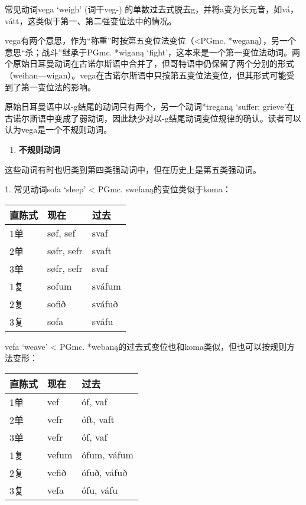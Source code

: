 常见动词vega `weigh‌' (词干veg-)
的单数过去式脱去g，并将a变为长元音，如vá，vátt，这类似于第一、第二强变位法中的情况。

vega有两个意思，作为``称重''时按第五变位法变位（\textless PGmc.
*weganą），另一个意思``杀；战斗''继承于PGmc. *wiganą
`fight'，这本来是一个第一变位法动词。两个原始日耳曼动词在古诺尔斯语中合并了，但哥特语中仍保留了两个分别的形式（weihan---wigan）。vega在古诺尔斯语中只按第五变位法变位，但其形式可能受到了第一变位法的影响。

原始日耳曼语中以-g结尾的动词只有两个，另一个动词*treganą `suffer;
grieve'在古诺尔斯语中变成了弱动词，因此缺少对以-g结尾动词变位规律的确认。读者可以认为vega是一个不规则动词。

\begin{enumerate}
  \def\labelenumi{\arabic{enumi})}
  \setcounter{enumi}{2}
  \item
        \textbf{不规则动词}
\end{enumerate}

这些动词有时也归类到第四类强动词中，但在历史上是第五类强动词。

1. 常见动词sofa `sleep‌' \textless{} PGmc. swefaną的变位类似于koma：

\begin{longtable}{lll}
  \toprule
  直陈式 & 现在         & 过去     \\
  \midrule
  \endhead
  \bottomrule
  \endfoot
  1单  & søf, sef   & svaf   \\
  2单  & søfr, sefr & svaft  \\
  3单  & søfr, sefr & svaf   \\
  1复  & sofum      & sváfum \\
  2复  & sofið      & sváfuð \\
  3复  & sofa       & sváfu  \\
\end{longtable}

vefa `weave' \textless{} PGmc.
*webaną的过去式变位也和koma类似，但也可以按规则方法变形：

\begin{longtable}{lll}
  \toprule
  直陈式 & 现在    & 过去          \\
  \midrule
  \endhead
  \bottomrule
  \endfoot
  1单  & vef   & óf, vaf     \\
  2单  & vefr  & óft, vaft   \\
  3单  & vefr  & óf, vaf     \\
  1复  & vefum & ófum, váfum \\
  2复  & vefið & ófuð, váfuð \\
  3复  & vefa  & ófu, váfu   \\
\end{longtable}

